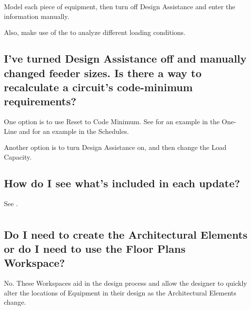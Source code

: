 \documentclass[letterpaper,10pt,english]{sphinxmanual}
\begin{document}
Model each piece of equipment, then turn off Design Assistance and enter the information manually.

Also, make use of the {\hyperref[\detokenize{docs/userguide/buildingelectricalmodel/one-line/index-one-line:one-line-load-calculations}]{}} to analyze different loading conditions.


\subsection{I’ve turned Design Assistance off and manually changed feeder sizes.  Is there a way to recalculate a circuit’s code-minimum requirements?}
\label{\detokenize{docs/faq:i-ve-turned-design-assistance-off-and-manually-changed-feeder-sizes-is-there-a-way-to-recalculate-a-circuit-s-code-minimum-requirements}}
One option is to use Reset to Code Minimum.  See {\hyperref[\detokenize{docs/userguide/buildingelectricalmodel/one-line/index-one-line:one-line-reset-to-code-minimum}]{}} for an example in the One-Line and {\hyperref[\detokenize{docs/userguide/buildingelectricalmodel/schedules/index-schedules:schedules-reset-to-code-minimum}]{}} for an example in the Schedules.

Another option is to turn Design Assistance on, and then change the Load Capacity.


\subsection{How do I see what’s included in each update?}
\label{\detokenize{docs/faq:how-do-i-see-what-s-included-in-each-update}}
See {\hyperref[\detokenize{docs/userguide/index-user_guide:release-data}]{}}.


\section{}
\label{\detokenize{docs/faq:architectural}}

\subsection{Do I need to create the Architectural Elements or do I need to use the Floor Plans Workspace?}
\label{\detokenize{docs/faq:do-i-need-to-create-the-architectural-elements-or-do-i-need-to-use-the-floor-plans-workspace}}
No.  These Workspaces aid in the design process and allow the designer to quickly alter the locations of Equipment in their design as the Architectural Elements change.
\end{document}
